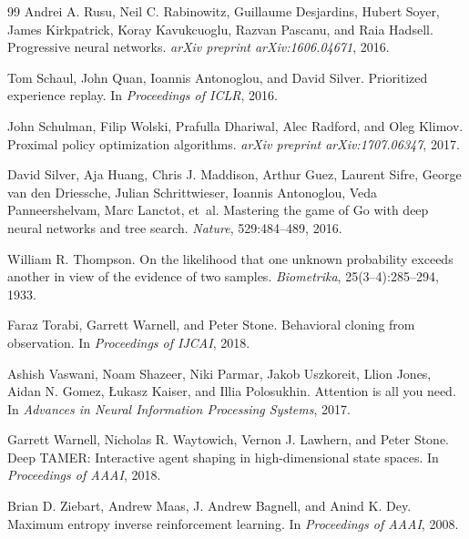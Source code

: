 \documentclass{article}
\begin{document}
\begin{thebibliography}{99}
Andrei A. Rusu, Neil C. Rabinowitz, Guillaume Desjardins, Hubert Soyer, James Kirkpatrick, Koray Kavukcuoglu, Razvan Pascanu, and Raia Hadsell.
\newblock Progressive neural networks.
\newblock \emph{arXiv preprint arXiv:1606.04671}, 2016.

Tom Schaul, John Quan, Ioannis Antonoglou, and David Silver.
\newblock Prioritized experience replay.
\newblock In \emph{Proceedings of ICLR}, 2016.

John Schulman, Filip Wolski, Prafulla Dhariwal, Alec Radford, and Oleg Klimov.
\newblock Proximal policy optimization algorithms.
\newblock \emph{arXiv preprint arXiv:1707.06347}, 2017.

David Silver, Aja Huang, Chris J. Maddison, Arthur Guez, Laurent Sifre, George van den Driessche, Julian Schrittwieser, Ioannis Antonoglou, Veda Panneershelvam, Marc Lanctot, et~al.
\newblock Mastering the game of Go with deep neural networks and tree search.
\newblock \emph{Nature}, 529:484--489, 2016.

William R. Thompson.
\newblock On the likelihood that one unknown probability exceeds another in view of the evidence of two samples.
\newblock \emph{Biometrika}, 25(3--4):285--294, 1933.

Faraz Torabi, Garrett Warnell, and Peter Stone.
\newblock Behavioral cloning from observation.
\newblock In \emph{Proceedings of IJCAI}, 2018.

Ashish Vaswani, Noam Shazeer, Niki Parmar, Jakob Uszkoreit, Llion Jones, Aidan N. Gomez, \L ukasz Kaiser, and Illia Polosukhin.
\newblock Attention is all you need.
\newblock In \emph{Advances in Neural Information Processing Systems}, 2017.

Garrett Warnell, Nicholas R. Waytowich, Vernon J. Lawhern, and Peter Stone.
\newblock Deep TAMER: Interactive agent shaping in high-dimensional state spaces.
\newblock In \emph{Proceedings of AAAI}, 2018.

Brian D. Ziebart, Andrew Maas, J. Andrew Bagnell, and Anind K. Dey.
\newblock Maximum entropy inverse reinforcement learning.
\newblock In \emph{Proceedings of AAAI}, 2008.

\end{thebibliography}
\end{document}
